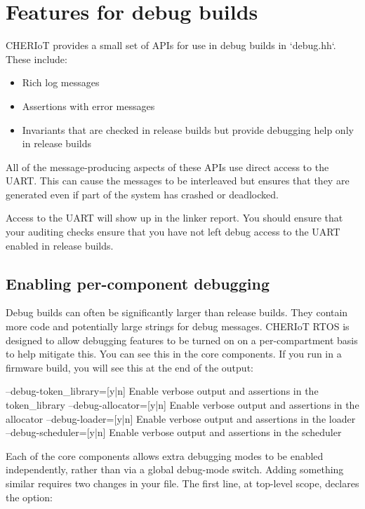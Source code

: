 \chapter{Features for debug builds}

CHERIoT provides a small set of APIs for use in debug builds in `debug.hh`.
These include:

\begin{itemize}
	\item{Rich log messages}
	\item{Assertions with error messages}
	\item{Invariants that are checked in release builds but provide debugging help only in release builds}
\end{itemize}

All of the message-producing aspects of these APIs use direct access to the UART.
This can cause the messages to be interleaved but ensures that they are generated even if part of the system has crashed or deadlocked.

Access to the UART will show up in the linker report.
You should ensure that your auditing checks ensure that you have not left debug access to the UART enabled in release builds.

\section{Enabling per-component debugging}

Debug builds can often be significantly larger than release builds.
They contain more code and potentially large strings for debug messages.
CHERIoT RTOS is designed to allow debugging features to be turned on on a per-compartment basis to help mitigate this.
You can see this in the core components.
If you run  in a firmware build, you will see this at the end of the output:

\begin{console}
--debug-token_library=[y|n] Enable verbose output and assertions in the token_library
--debug-allocator=[y|n]     Enable verbose output and assertions in the allocator
--debug-loader=[y|n]        Enable verbose output and assertions in the loader
--debug-scheduler=[y|n]     Enable verbose output and assertions in the scheduler
\end{console}

Each of the core components allows extra debugging modes to be enabled independently, rather than via a global debug-mode switch.
Adding something similar requires two changes in your  file.
The first line, at top-level scope, declares the option:

